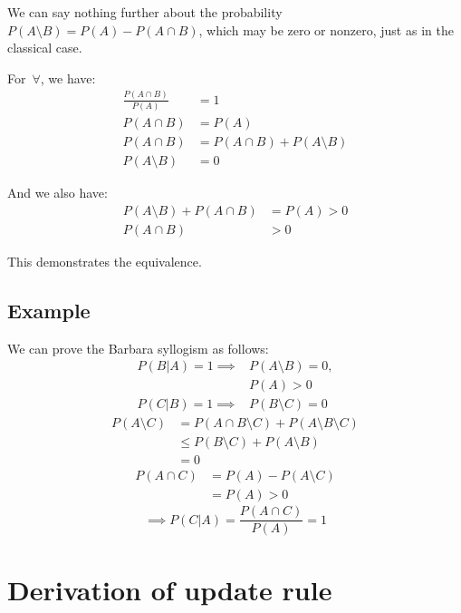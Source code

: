 \documentclass[11pt]{article}
\begin{document}
We can say nothing further about the probability ${P(A\setminus B) = P(A) - P(A\cap B)}$,
which may be zero or nonzero,
just as in the classical case.

For~$\forall$, we have:
\begin{align*}
\frac{P(A\cap B)}{P(A)} & = 1 \\
P(A\cap B) & = P(A) \\
P(A\cap B) & = P(A\cap B) + P(A\setminus B) \\
P(A\setminus B) & = 0
\end{align*}

And we also have:
\begin{align*}
P(A\setminus B) + P(A\cap B) & = P(A) > 0 \\
P(A\cap B) & > 0
\end{align*}

This demonstrates the equivalence.

\subsection{Example}

We can prove the Barbara syllogism as follows:
\begin{align*}
P(B|A) = 1 \implies& P(A\setminus B) = 0, \\
& P(A) > 0 \\
P(C|B) = 1 \implies& P(B\setminus C) = 0
\end{align*}
\begin{align*}
P(A\setminus C) &= P(A\cap B\setminus C) + P(A\setminus B\setminus C) \\
&\leq P(B\setminus C) + P(A\setminus B) \\
&= 0
\end{align*}
\begin{align*}
P(A\cap C) &= P(A) - P(A\setminus C) \\
&= P(A) > 0
\end{align*}
\begin{equation*}
\implies P(C|A) = \frac{P(A\cap C)}{P(A)} = 1
\end{equation*}

\pagebreak


\section{Derivation of update rule}
\label{append:update}

\newcommand{\dq}{\frac{\partial}{\partial q_i}}
\end{document}
